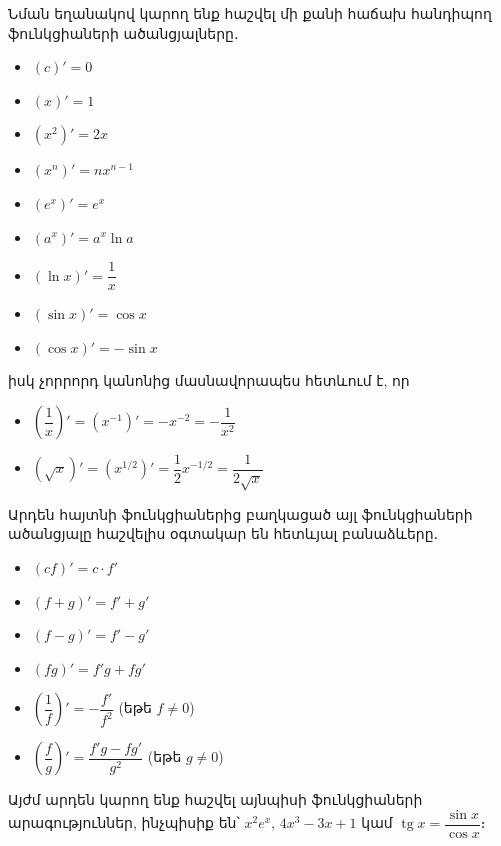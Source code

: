 Նման եղանակով կարող ենք հաշվել մի քանի հաճախ հանդիպող ֆունկցիաների ածանցյալները․  \label{derivatives_list}
\begin{itemize}
    \item $(c)' = 0$ 
    \item $(x)' = 1$
    \item $(x^2)' = 2x$
    \item $(x^n)' = nx^{n-1}$ 
    \item $(e^x)' = e^x$
    \item $(a^x)' = a^x\ln a$
    \item $(\ln x)' = \dfrac{1}{x}$
    \item $(\sin x)'=\cos x$
    \item $(\cos x)'=-\sin x$
\end{itemize}
իսկ չորրորդ կանոնից մասնավորապես հետևում է, որ
\begin{itemize}
    \item $\left(\dfrac{1}{x}\right)'=\left(x^{-1}\right)'=-x^{-2}=-\dfrac{1}{x^2}$
    \item $\left(\sqrt{x}\right)'=\left(x^{1/2}\right)'=\dfrac{1}{2}x^{-1/2}=\dfrac{1}{2\sqrt{x}}$
\end{itemize}


Արդեն հայտնի ֆունկցիաներից բաղկացած այլ ֆունկցիաների ածանց\-յալը հաշվելիս օգտակար են հետևյալ բանաձևերը․
\begin{itemize}
    \item $(cf)'=c\cdot f'$
    \item $(f + g)'=f' + g'$
    \item $(f - g)'=f' - g'$
    \item $(fg)'=f'g+fg'$
    \item $\left(\dfrac{1}{f}\right)'=-\dfrac{f'}{f^2}$ (եթե $f\ne 0$)
    \item $\left(\dfrac{f}{g}\right)'=\dfrac{f'g-fg'}{g^2}$ (եթե $g\ne 0$)
\end{itemize}

Այժմ արդեն կարող ենք հաշվել այնպիսի ֆունկցիաների արագություն\-ներ, ինչպիսիք են՝ $x^2e^x$, $4x^3-3x+1$ կամ $\operatorname{tg}x=\dfrac{\sin x}{\cos x}$։ 

